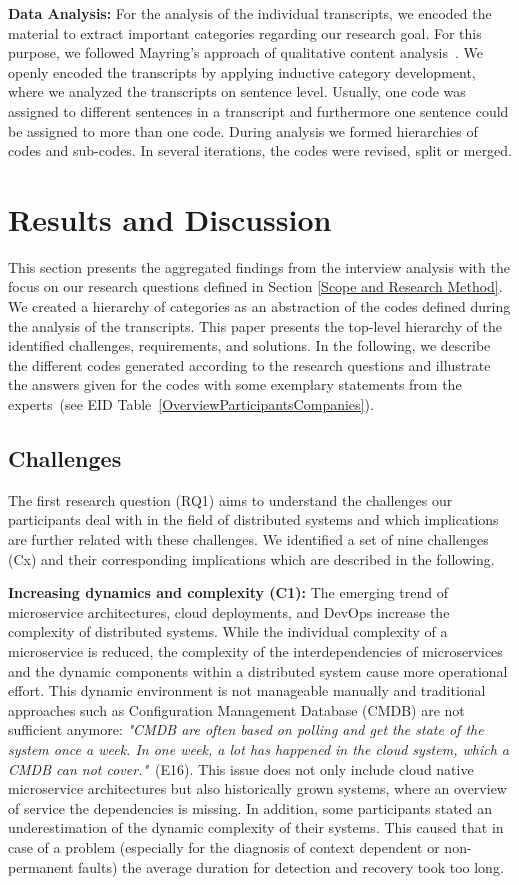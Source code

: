\documentclass[runningheads]{llncs}
\begin{document}
\textbf{Data Analysis:}
For the analysis of the individual transcripts, we encoded the material to extract important categories regarding our research goal. For this purpose, we followed Mayring's approach of qualitative content analysis~\cite{mayring2014qualitative}. We openly encoded the transcripts by applying inductive category development, where we analyzed the transcripts on sentence level. Usually, one code was assigned to different sentences in a transcript and furthermore one sentence could be assigned to more than one code. During analysis we formed hierarchies of codes and sub-codes. In several iterations, the codes were revised, split or merged.

\section{Results and Discussion}
\label{Results and Discussion}
This section presents the aggregated findings from the interview analysis with the focus on our research questions defined in Section \ref{Scope and Research Method}. We created a hierarchy of categories as an abstraction of the codes defined during the analysis of the transcripts. This paper presents the top-level hierarchy of the identified challenges, requirements, and solutions. In the following, we describe the different codes generated according to the research questions and illustrate the answers given for the codes with some exemplary statements from the experts~(see EID Table~\ref{OverviewParticipantsCompanies}).

\subsection{Challenges}
\label{Challenges}
The first research question (RQ1) aims to understand the challenges our participants deal with in the field of distributed systems and which implications are further related with these challenges. We identified a set of nine challenges (Cx) and their corresponding implications which are described in the following.

\textbf{Increasing dynamics and complexity (C1):}
The emerging trend of microservice architectures, cloud deployments, and DevOps increase the complexity of distributed systems. While the individual complexity of a microservice is reduced, the complexity of the interdependencies of microservices and the dynamic components within a distributed system cause more operational effort. This dynamic environment is not manageable manually and traditional approaches such as Configuration Management Database (CMDB) \cite{colville2006cmdb} are not sufficient anymore:
\textit{"CMDB are often based on polling and get the state of the system once a week. In one week, a lot has happened in the cloud system, which a CMDB can not cover."}~(E16). This issue does not only include cloud native microservice architectures but also historically grown systems, where an overview of service the dependencies is missing. In addition, some participants stated an underestimation of the dynamic complexity of their systems. This caused that in case of a problem (especially for the diagnosis of context dependent or non-permanent faults) the average duration for detection and recovery took too long.
\end{document}
